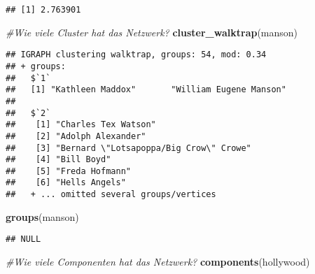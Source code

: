\documentclass[
]{article}
\newenvironment{Shaded}{\begin{snugshade}}{\end{snugshade}}
\newcommand{\CommentTok}[1]{\textcolor[rgb]{0.56,0.35,0.01}{\textit{#1}}}
\newcommand{\KeywordTok}[1]{\textcolor[rgb]{0.13,0.29,0.53}{\textbf{#1}}}
\newcommand{\NormalTok}[1]{#1}
\begin{document}
\begin{verbatim}
## [1] 2.763901
\end{verbatim}

\begin{Shaded}
\begin{Highlighting}[]
\CommentTok{#Wie    viele   Cluster hat das Netzwerk?}
\KeywordTok{cluster_walktrap}\NormalTok{(manson)}
\end{Highlighting}
\end{Shaded}

\begin{verbatim}
## IGRAPH clustering walktrap, groups: 54, mod: 0.34
## + groups:
##   $`1`
##   [1] "Kathleen Maddox"       "William Eugene Manson"
##   
##   $`2`
##    [1] "Charles Tex Watson"                   
##    [2] "Adolph Alexander"                     
##    [3] "Bernard \"Lotsapoppa/Big Crow\" Crowe"
##    [4] "Bill Boyd"                            
##    [5] "Freda Hofmann"                        
##    [6] "Hells Angels"                         
##   + ... omitted several groups/vertices
\end{verbatim}

\begin{Shaded}
\begin{Highlighting}[]
\KeywordTok{groups}\NormalTok{(manson)}
\end{Highlighting}
\end{Shaded}

\begin{verbatim}
## NULL
\end{verbatim}

\begin{Shaded}
\begin{Highlighting}[]
\CommentTok{#Wie    viele   Componenten hat das Netzwerk?}
\KeywordTok{components}\NormalTok{(hollywood)}
\end{Highlighting}
\end{Shaded}
\end{document}
